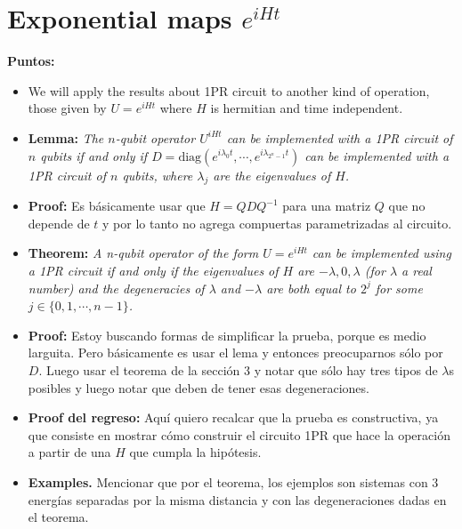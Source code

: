 \documentclass[10pt,letterpaper]{article} %
\begin{document}
\section{Exponential maps $e^{iHt}$} %
\label{sec: Exponential maps}
\textbf{Puntos:}
\begin{itemize}
\item We will apply the results about 1PR circuit to another kind of operation, those given by $U  = e^{iHt}$ where $H$ is hermitian  and time independent.
\item \textbf{Lemma:}\textit{ The $n$-qubit operator $U^{iHt}$ can be implemented with a 1PR circuit of $n$ qubits if and only if $D = \text{diag}(e^{i\lambda_0 t}, \cdots, e^{i \lambda_{2^n-1}t})$ can be implemented with a 1PR circuit of $n$ qubits, where $\lambda_j$ are the eigenvalues of $H$.}
\item \textbf{Proof:}  Es b\'asicamente usar que $H = QDQ^{-1}$ para una matriz $Q$ que no depende de $t$ y por lo tanto no agrega compuertas parametrizadas al circuito. 
\item \textbf{Theorem:} \textit{ A n-qubit operator of the form $U = e^{iHt}$ can be implemented using a 1PR circuit if and only if the eigenvalues of $H$ are $-\lambda,0,\lambda$ (for $\lambda$ a real number) and the degeneracies of $\lambda$ and $-\lambda$ are both equal to $2^j$ for some $j\in \{0,1,\cdots,n-1\}$.}
\item \textbf{Proof:} Estoy buscando formas de simplificar la prueba, porque es medio larguita. Pero básicamente es usar el lema y entonces preocuparnos sólo por $D$. Luego  usar el teorema de la sección 3 y notar que sólo hay tres tipos de  $\lambda$s posibles y luego notar que deben de tener esas degeneraciones.
\item \textbf{Proof del regreso:} Aquí quiero recalcar que la prueba es constructiva, ya que consiste en mostrar cómo construir el circuito 1PR que hace la operación a partir de una $H$ que cumpla la hipótesis. 
\item \textbf{Examples.} Mencionar que por el teorema, los ejemplos son sistemas con 3 energías separadas por la misma distancia y con las degeneraciones dadas en el teorema. 

\end{itemize}
\end{document}

